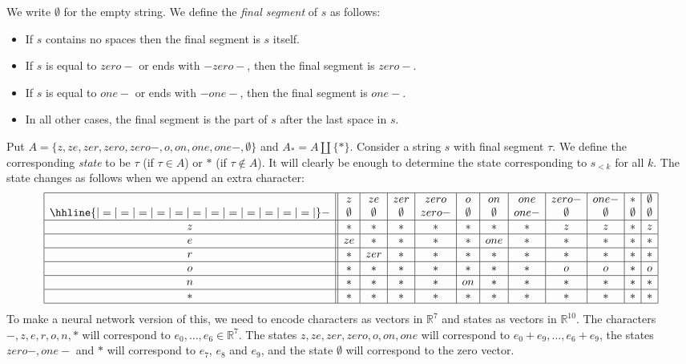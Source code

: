 \documentclass{amsart}
\newcommand{\R}         {{\mathbb{R}}}
\newcommand{\es}        {\emptyset}
\renewcommand{\:}{\colon}
\theoremstyle{definition}
\begin{document}
We write $\emptyset$ for the empty string.  We define the \emph{final
 segment} of $s$ as follows: 
\begin{itemize}
 \item If $s$ contains no spaces then the final segment is $s$
  itself. 
 \item If $s$ is equal to $zero-$ or ends with $-zero-$, then the
  final segment is $zero-$.
 \item If $s$ is equal to $one-$ or ends with $-one-$, then the
  final segment is $one-$.
 \item In all other cases, the final segment is the part of $s$
  after the last space in $s$.
\end{itemize}
Put $A=\{z,ze,zer,zero,zero-,o,on,one,one-,\emptyset\}$ and 
$A_*=A\amalg\{*\}$.  Consider a string $s$ with final segment
$\tau$.  We define the corresponding \emph{state} to be $\tau$ (if
$\tau\in A$) or $*$ (if $\tau\not\in A$).  It will clearly be enough
to determine the state corresponding to $s_{<k}$ for all $k$.  The
state changes as follows when we append an extra character:
\[ \begin{array}{|c||c|c|c|c|c|c|c|c|c|c|c|} \hline
      & z   & ze  & zer & zero  & o   & on  & one  & zero- & one- & *   & \es \\ 
      \hhline{|=|=|=|=|=|=|=|=|=|=|=|=|}
    - & \es & \es & \es & zero- & \es & \es & one- & \es   & \es  & \es & \es \\ \hline
    z & *   & *   & *   & *     & *   & *   & *    & z     & z    & *   & z   \\ \hline
    e & ze  & *   & *   & *     & *   & one & *    & *     & *    & *   & *   \\ \hline
    r & *   & zer & *   & *     & *   & *   & *    & *     & *    & *   & *   \\ \hline
    o & *   & *   & *   & *     & *   & *   & *    & o     & o    & *   & o   \\ \hline
    n & *   & *   & *   & *     & on  & *   & *    & *     & *    & *   & *   \\ \hline
    * & *   & *   & *   & *     & *   & *   & *    & *     & *    & *   & *   \\ \hline
   \end{array}
\]
To make a neural network version of this, we need to encode
characters as vectors in $\R^7$ and states as vectors in $\R^{10}$.
The characters $-,z,e,r,o,n,*$ will correspond to
$e_0,\dotsc,e_6\in\R^7$.  The states $z,ze,zer,zero,o,on,one$ will
correspond to $e_0+e_9,\dotsc,e_6+e_9$, the states $zero-,one-$ and
$*$ will correspond to $e_7$, $e_8$ and $e_9$, and the state
$\emptyset$ will correspond to the zero vector.
\end{document}
